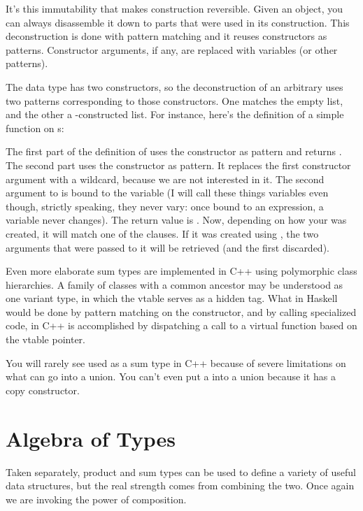 It's this immutability that makes construction reversible. Given an
object, you can always disassemble it down to parts that were used in
its construction. This deconstruction is done with pattern matching and
it reuses constructors as patterns. Constructor arguments, if any, are
replaced with variables (or other patterns).

The  data type has two constructors, so the deconstruction
of an arbitrary  uses two patterns corresponding to those
constructors. One matches the empty  list, and the other a
-constructed list. For instance, here's the definition of a
simple function on s:

The first part of the definition of  uses the
 constructor as pattern and returns . The
second part uses the  constructor as pattern. It replaces
the first constructor argument with a wildcard, because we are not
interested in it. The second argument to  is bound to the
variable  (I will call these things variables even though,
strictly speaking, they never vary: once bound to an expression, a
variable never changes). The return value is . Now,
depending on how your  was created, it will match one of
the clauses. If it was created using , the two arguments
that were passed to it will be retrieved (and the first discarded).

Even more elaborate sum types are implemented in C++ using polymorphic
class hierarchies. A family of classes with a common ancestor may be
understood as one variant type, in which the vtable serves as a hidden
tag. What in Haskell would be done by pattern matching on the
constructor, and by calling specialized code, in C++ is accomplished by
dispatching a call to a virtual function based on the vtable pointer.

You will rarely see  used as a sum type in C++ because of
severe limitations on what can go into a union. You can't even put a
 into a union because it has a copy constructor.

\section{Algebra of Types}

Taken separately, product and sum types can be used to define a variety
of useful data structures, but the real strength comes from combining
the two. Once again we are invoking the power of composition.

